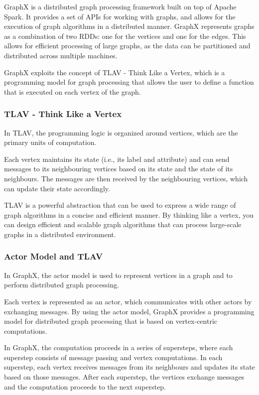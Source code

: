 GraphX is a distributed graph processing framework built on top of Apache Spark. It provides a set of APIs for working with graphs, and allows for the execution of graph algorithms in a distributed manner.
GraphX represents graphs as a combination of two RDDs: one for the vertices and one for the edges.
This allows for efficient processing of large graphs, as the data can be partitioned and distributed across multiple machines.

GraphX exploits the concept of TLAV - Think Like a Vertex, which is a programming model for graph processing that allows the user to define a function that is executed on each vertex of the graph.

\subsubsection{TLAV - Think Like a Vertex}
In TLAV, the programming logic is organized around vertices, which are the primary
units of computation.

Each vertex maintains its state (i.e., its label and attribute) and can send messages
to its neighbouring vertices based on its state and the state of its neighbours.
The messages are then received by the neighbouring vertices, which can update
their state accordingly.

TLAV is a powerful abstraction that can be used to express a wide range of graph
algorithms in a concise and efficient manner. By thinking like a vertex, you can
design efficient and scalable graph algorithms that can process large-scale graphs
in a distributed environment.

\subsubsection{Actor Model and TLAV}

In GraphX, the actor model is used to represent vertices in a graph and to perform distributed graph processing.

Each vertex is represented as an actor, which communicates with other actors by exchanging messages. By using the actor model, GraphX provides a programming model for distributed graph processing that is based on vertex-centric computations.

In GraphX, the computation proceeds in a series of supersteps, where each superstep consists of message passing and vertex computations. In each superstep, each vertex receives messages from its neighbours and updates its state based on those messages. After each superstep, the vertices exchange messages and the computation proceeds to the next superstep.